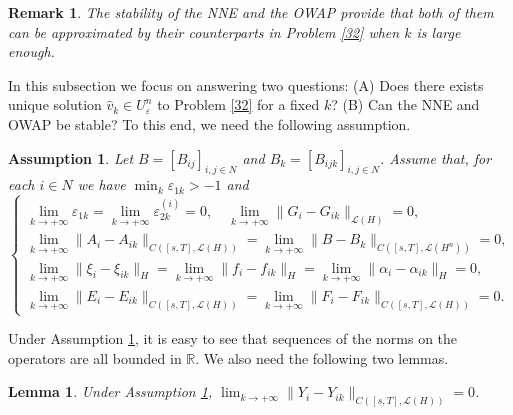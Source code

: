 \documentclass[10pt]{article}
\newtheorem{lemma}{Lemma}[section]
\newtheorem{assumption}{Assumption}[section]
\newtheorem{remark}{Remark}[section]
\begin{document}
\begin{remark}
The stability of the NNE and the OWAP  provide that both of them can be approximated   by their counterparts in Problem \ref{32} when $k$ is large enough.
\end{remark}
 In this subsection we  focus on answering  two questions: (A) Does there exists unique solution $\widehat{v}_k\in U^n_{\varepsilon}$ to Problem \ref{32} for a fixed $k$? (B) Can the NNE    and OWAP be stable? To this end,  we need the following assumption.
\begin{assumption}\label{21}
Let $B=[B_{ij}]_{i,j\in N}$ and $B_k=[B_{ijk}]_{i,j\in N}$. Assume that, for each $i\in N$ we have $\min_{k}\varepsilon_{1k}>-1$ and
\begin{equation*}
  \begin{cases}
  \lim_{k\rightarrow+\infty}\varepsilon_{1k}=\lim_{k\rightarrow+\infty}\varepsilon_{2k}^{(i)}=0,\quad\lim_{k\rightarrow+\infty}\|G_i-G_{ik}\|_{\mathcal{L}(H)}=0,\\
    \lim_{k\rightarrow+\infty}\|A_i-A_{ik}\|_{ C([s,T],\mathcal{L}(H))}=\lim_{k\rightarrow+\infty}\|B-B_{k}\|_{ C([s,T],\mathcal{L}(H^n))}=0, \\
  \lim_{k\rightarrow+\infty}\|\xi_i-\xi_{ik}\|_H=\lim_{k\rightarrow+\infty}\|f_i-f_{ik}\|_{H}=\lim_{k\rightarrow+\infty}\|\alpha_i-\alpha_{ik}\|_{H}=0, \\
  \lim_{k\rightarrow+\infty}\|E_i-E_{ik}\|_{ C([s,T],\mathcal{L}(H))}=\lim_{k\rightarrow+\infty}\|F_i-F_{ik}\|_{ C([s,T],\mathcal{L}(H))}=0.
  \end{cases}
\end{equation*}
\end{assumption}
Under Assumption \ref{21}, it is easy to see that    sequences of the norms on the operators    are all bounded in $\mathbb{R}$.   We also need the following two lemmas.
\begin{lemma}\label{14}
Under Assumption \ref{21}, $\lim_{k\rightarrow+\infty}\|Y_i-Y_{ik}\|_{ C([s,T],\mathcal{L}(H))}=0$.
\end{lemma}
\end{document}
